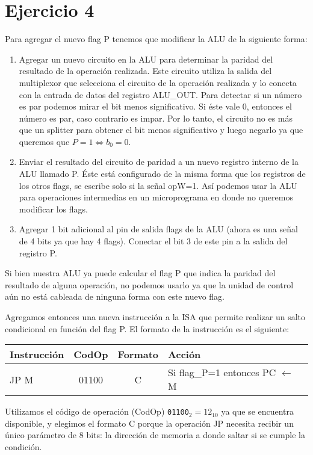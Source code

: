\section{Ejercicio 4}

Para agregar el nuevo flag P tenemos que modificar la ALU de la siguiente forma:

\begin{enumerate}
    \item Agregar un nuevo circuito en la ALU para determinar la paridad del resultado de la operación realizada. Este circuito utiliza la salida del multiplexor que selecciona el circuito de la operación realizada y lo conecta con la entrada de datos del registro ALU\_OUT. Para detectar si un número es par podemos mirar el bit menos significativo. Si éste vale 0, entonces el número es par, caso contrario es impar. Por lo tanto, el circuito no es más que un splitter para obtener el bit menos significativo y luego negarlo ya que queremos que $P=1 \iff b_0 = 0$.
    \item Enviar el resultado del circuito de paridad a un nuevo registro interno de la ALU llamado P. Éste está configurado de la misma forma que los registros de los otros flags, se escribe solo si la señal opW=1. Así podemos usar la ALU para operaciones intermedias en un microprograma en donde no queremos modificar los flags.
    \item Agregar 1 bit adicional al pin de salida flags de la ALU (ahora es una señal de 4 bits ya que hay 4 flags). Conectar el bit 3 de este pin a la salida del registro P.
\end{enumerate}

Si bien nuestra ALU ya puede calcular el flag P que indica la paridad del resultado de alguna operación, no podemos usarlo ya que la unidad de control aún no está cableada de ninguna forma con este nuevo flag.

Agregamos entonces una nueva instrucción a la ISA que permite realizar un salto condicional en función del flag P. El formato de la instrucción es el siguiente:

\begin{table}[ht]
\ttfamily
\begin{tabular}{|l|c|c|l|}
    Instrucción & CodOp & Formato & Acción \\
    \hline
    JP M & 01100 & C & Si flag\_P=1 entonces PC $\gets$ M
\end{tabular}
\end{table}

Utilizamos el código de operación (CodOp) \lstinline{01100}$_2 = 12_{10}$ ya que se encuentra disponible, y elegimos el formato C porque la operación JP necesita recibir un único parámetro de 8 bits: la dirección de memoria a donde saltar si se cumple la condición.

